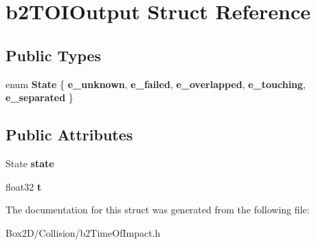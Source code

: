 \hypertarget{structb2_t_o_i_output}{}\section{b2\+T\+O\+I\+Output Struct Reference}
\label{structb2_t_o_i_output}
\subsection*{Public Types}
\begin{DoxyCompactItemize}
\item 
\mbox{\label{structb2_t_o_i_output_a12c3cf4dc0551f5c8249dc1dd867959a}} 
enum {\bfseries State} \{ \newline
{\bfseries e\+\_\+unknown}, 
{\bfseries e\+\_\+failed}, 
{\bfseries e\+\_\+overlapped}, 
{\bfseries e\+\_\+touching}, 
\newline
{\bfseries e\+\_\+separated}
 \}
\end{DoxyCompactItemize}
\subsection*{Public Attributes}
\begin{DoxyCompactItemize}
\item 
\mbox{\label{structb2_t_o_i_output_aaacbf28f437b965ffecabf1407a77915}} 
State {\bfseries state}
\item 
\mbox{\label{structb2_t_o_i_output_a94f8b756e060892226ec006db4be7ee3}} 
float32 {\bfseries t}
\end{DoxyCompactItemize}


The documentation for this struct was generated from the following file\+:\begin{DoxyCompactItemize}
\item 
Box2\+D/\+Collision/b2\+Time\+Of\+Impact.\+h\end{DoxyCompactItemize}
